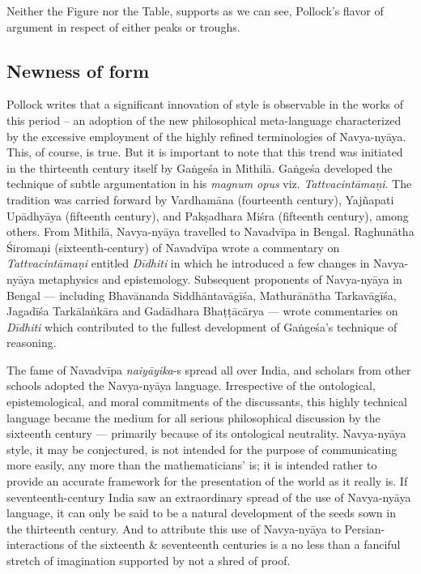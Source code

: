 \newpage

Neither the Figure nor the Table, supports as we can see, Pollock’s flavor of argument in respect of either peaks or troughs.

\subsection{Newness of form}%

Pollock writes that a significant innovation of style is observable in the works of this period – an adoption of the new philosophical meta-language characterized by the excessive employment of the highly refined terminologies of Navya-nyāya. This, of course, is true. But it is important to note that this trend was initiated in the thirteenth century itself by Gaṅgeśa in Mithilā. Gaṅgeśa developed the technique of subtle argumentation in his {\sl magnum opus}  viz. {\sl Tattvacintāmaṇi}. The tradition was carried forward by Vardhamāna (fourteenth century), Yajñapati Upādhyāya (fifteenth century), and Pakṣadhara Miśra (fifteenth century), among others. From Mithilā, Navya-nyāya travelled to Navadvīpa in Bengal. Raghunātha Śiromaṇi (sixteenth-century) of Navadvīpa wrote a commentary on {\sl Tattvacintāmaṇi} entitled {\sl Dīdhiti} in which he introduced a few changes in Navya-nyāya metaphysics and epistemology. Subsequent proponents of Navya-nyāya in Bengal — including Bhavānanda Siddhāntavāgīśa, Mathurānātha Tarkavāgīśa, Jagadīśa Tarkālaṅkāra and Gadādhara Bhaṭṭācārya — wrote commentaries on {\sl Dīdhiti} which contributed to the fullest development of Gaṅgeśa’s technique of reasoning. 

The fame of Navadvīpa {\sl naiyāyika}-s spread all over India, and scholars from other schools adopted the Navya-nyāya language.  Irrespective of the ontological, epistemological, and moral commitments of the discussants, this highly technical language became the medium for all serious philosophical discussion by the sixteenth century — primarily because of its ontological neutrality. Navya-nyāya style, it may be conjectured, is not intended for the purpose of communicating more easily, any more than the mathematicians’ is; it is intended rather to provide an accurate framework for the presentation of the world as it really is. If seventeenth-century India saw an extraordinary spread of the use of Navya-nyāya language, it can only be said to be a natural development of the seeds sown in the thirteenth century. And to attribute this use of Navya-nyāya to Persian-interactions of the sixteenth \& seventeenth centuries is a no less than a fanciful stretch of imagination supported by not a shred of proof. 

